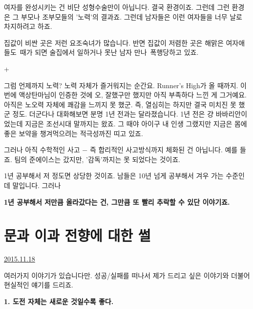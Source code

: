 여자를 완성시키는 건 비단 성형수술만이 아닙니다. 결국 환경이죠.
그런데 그런 환경은 그 부모나 조부모들의 '노력'의 결과죠.
그런데 남자들은 이런 여자들을 너무 날로 차지하려고 하죠.
\vspace{5mm}

집값이 비싼 곳은 저런 요조숙녀가 많습니다.
반면 집값이 저렴한 곳은 해맑은 여자애들도 때가 되면 술집에서 일하거나 못난 남자 만나 폭행당하고 있죠.
\vspace{5mm}

+
\vspace{5mm}

그럼 언제까지 노력?
노력 자체가 즐거워지는 순간요. Runner's High가 올 때까지.
이번에 액상탄마님이 인증한 것에 오, 잘했구만 했지만 아직 부족하다 느낀 게 그거예요.
아직은 노오력 자체에 쾌감을 느끼지 못 했군. 즉, 열심히는 하지만 결국 미치진 못 했군 정도.
더군다나 대화해보면 분명 1년 전과는 달라졌습니다.
1년 전은 걍 바바리안이었는데 지금은 조선시대 말까지는 왔죠.
그 때야 아이구 내 인생 그랬지만 지금은 몸에 좋은 보약을 챙겨먹으려는 적극성까진 띠고 있죠.
\vspace{5mm}

그러나 아직 수학적인 사고 $-$ 즉 합리적인 사고방식까지 체화된 건 아닙니다.
예를 들죠. 팀의 준에이스는 갔지만, '감독'까지는 못 되었다는 것이죠.
\vspace{5mm}

1년 공부해서 저 정도면 상당한 것이죠. 남들은 10년 넘게 공부해서 겨우 가는 수준인데 말입니다.
그러나
\vspace{5mm}

\textbf{1년 공부해서 저만큼 올라갔다는 건, 그만큼 또 빨리 추락할 수 있단 이야기죠.}
\vspace{5mm}






\section{문과 이과 전향에 대한 썰}
\href{https://www.kockoc.com/Apoc/499454}{2015.11.18}

\vspace{5mm}

여러가지 이야기가 있습니다만.
성공/실패를 떠나서 제가 드리고 싶은 이야기와 더불어 현실적인 얘기를 드리죠.
\vspace{5mm}

\item \textbf{1. 도전 자체는 새로운 것일수록 좋다.}
\vspace{5mm}

